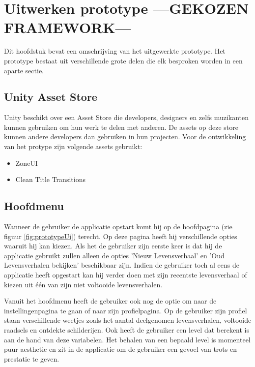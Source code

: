 \chapter{Uitwerken prototype ---GEKOZEN FRAMEWORK---}
\label{ch:prototype}

Dit hoofdstuk bevat een omschrijving van het uitgewerkte prototype. Het prototype bestaat uit verschillende grote delen die elk besproken worden in een aparte sectie.

\section{Unity Asset Store}
Unity beschikt over een Asset Store die developers, designers en zelfs muzikanten kunnen gebruiken om hun werk te delen met anderen. De assets op deze store kunnen andere developers dan gebruiken in hun projecten. Voor de ontwikkeling van het protype zijn volgende assets gebruikt:

\begin{itemize}
    \item ZoneUI \autocite{MichskyZone}
    \item Clean Title Transitions \autocite{MichskyTitle}
\end{itemize}

\section{Hoofdmenu}
Wanneer de gebruiker de applicatie opstart komt hij op de hoofdpagina (zie figuur \ref{fig:prototypeUi}) terecht. Op deze pagina heeft hij verschillende opties waaruit hij kan kiezen. Als het de gebruiker zijn eerste keer is dat hij de applicatie gebruikt zullen alleen de opties 'Nieuw Levensverhaal' en 'Oud Levensverhalen bekijken' beschikbaar zijn. Indien de gebruiker toch al eens de applicatie heeft opgestart kan hij verder doen met zijn recentste levensverhaal of kiezen uit één van zijn niet voltooide levensverhalen. 

Vanuit het hoofdmenu heeft de gebruiker ook nog de optie om naar de instellingenpagina te gaan of naar zijn profielpagina. Op de gebruiker zijn profiel staan verschillende weetjes zoals het aantal deelgenomen levensverhalen, voltooide raadsels en ontdekte schilderijen. Ook heeft de gebruiker een level dat berekent is aan de hand van deze variabelen. Het behalen van een bepaald level is momenteel puur aesthetic en zit in de applicatie om de gebruiker een gevoel van trots en prestatie te geven.

